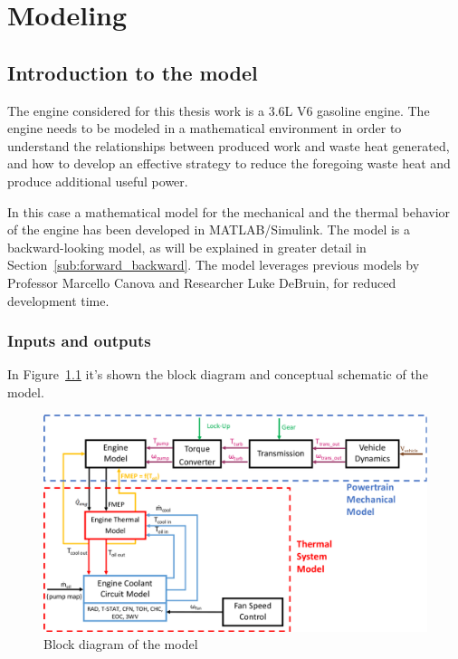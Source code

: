 \chapter{Modeling}

\section{Introduction to the model} 
 
The engine considered for this thesis work is a 3.6L V6 gasoline engine. The engine needs to be modeled in a mathematical environment in order to understand the relationships between produced work and waste heat generated, and how to develop an effective strategy to reduce the foregoing waste heat and produce additional useful power.

In this case a mathematical model for the mechanical and the thermal behavior of the engine has been developed in MATLAB/Simulink. The model is a backward-looking model, as will be explained in greater detail in Section~\ref{sub:forward_backward}. The model leverages previous models by Professor Marcello Canova and Researcher Luke DeBruin, for reduced development time.
 
\subsection{Inputs and outputs}

In Figure~\ref{fig:model_block_diagram} it's shown the block diagram and conceptual schematic of the model.

\begin{figure}[ht]
  \centering
  \includegraphics[width=\textwidth]{figures/model/block_diagram.pdf}
  \caption{Block diagram of the model\label{fig:model_block_diagram} }
\end{figure}

